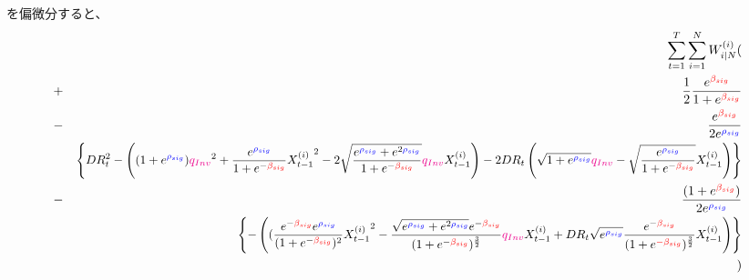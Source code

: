\documentclass[a4j,11pt]{jarticle}
\begin{document}
を偏微分すると、
\begin{eqnarray}
&&\sum_{t=1}^{T}\sum_{i=1}^{N}W_{i|N}^{(i)}(\nonumber\\
&+&\frac{1}{2}\frac{e^{\textcolor{red}{\beta_{sig}}}}{1+e^{\textcolor{red}{\beta_{sig}}}}\nonumber\\
&-&\frac{e^{\textcolor{red}{\beta_{sig}}}}{2e^{\textcolor{blue}{\rho_{sig}}}}\nonumber\\
&&\scalebox{0.95}{$\displaystyle
\left\{DR_t^2-
\left((1+ e^{\textcolor{blue}{\rho_{sig}}} ) \textcolor{magenta}{q_{Inv}}^2+\frac{e^{\textcolor{blue}{\rho_{sig}}}}{1+e^{-\textcolor{red}{\beta_{sig}}}}{X_{t-1}^{(i)}}^2 - 2 \sqrt{\frac{e^{\textcolor{blue}{\rho_{sig}}} + e^{2\textcolor{blue}{\rho_{sig}}} }{1+e^{-\textcolor{red}{\beta_{sig}}}} }\textcolor{magenta}{q_{Inv}}X_{t-1}^{(i)}\right)
 - 2DR_t
\left(\sqrt{1+e^{\textcolor{blue}{\rho_{sig}}}} \textcolor{magenta}{q_{Inv}}-\sqrt{\frac{e^{\textcolor{blue}{\rho_{sig}}}}{1+e^{-\textcolor{red}{\beta_{sig}}}}}X_{t-1}^{(i)}\right)
 \right\}
$}\nonumber\\
&-&\frac{(1+e^{\textcolor{red}{\beta_{sig}}})}{2e^{\textcolor{blue}{\rho_{sig}}}}\nonumber\\
&&
\scalebox{0.95}{$\displaystyle
\left\{-
\left((\frac{e^{-\textcolor{red}{\beta_{sig}}} e^{\textcolor{blue}{\rho_{sig}}}}{(1+e^{-\textcolor{red}{\beta_{sig}}})^2}{X_{t-1}^{(i)}}^2 -  \frac{\sqrt{e^{\textcolor{blue}{\rho_{sig}}} + e^{2\textcolor{blue}{\rho_{sig}}} }e^{-\textcolor{red}{\beta_{sig}}}}{(1+e^{-\textcolor{red}{\beta_{sig}}})^\frac{3}{2} } \textcolor{magenta}{q_{Inv}}X_{t-1}^{(i)}
 + DR_t
\sqrt{e^{\textcolor{blue}{\rho_{sig}}} } \frac{e^{-\textcolor{red}{\beta_{sig}}}}{(1+e^{\textcolor{red}{-\beta_{sig}}})^\frac{3}{2}} X_{t-1}^{(i)}\right)
 \right\}
$}\nonumber\\
&&)
\end{eqnarray}
\end{document}

